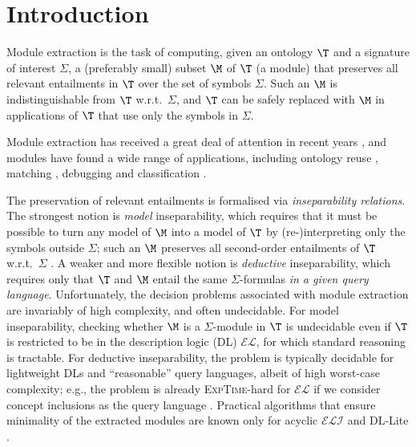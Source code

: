 
\section{Introduction}

Module extraction is the task of computing, given an ontology
$\T$ and a signature of interest $\Sigma$, a (preferably small) subset $\M$ of
$\T$ (a module) that preserves all relevant entailments
in $\T$ over the set of symbols $\Sigma$. 
Such an $\M$ is indistinguishable from $\T$ w.r.t.\ $\Sigma$, 
and $\T$ can be safely replaced with $\M$
in applications of $\T$ that use only the symbols in $\Sigma$. 

Module extraction has received a great deal of attention in recent years
\cite{DBLP:series/lncs/5445,GrauHKS08JAIR,DBLP:conf/www/SeidenbergR06,DBLP:journals/ai/KontchakovWZ10,DBLP:conf/dlog/GatensKW14,DBLP:conf/ijcai/VescovoPSS11,DBLP:conf/lpar/NortjeBM13}, 
and modules have found a wide range of applications, including
ontology reuse \cite{GrauHKS08JAIR,DBLP:conf/esws/Jimenez-RuizGSSL08},  matching \cite{DBLP:conf/semweb/Jimenez-RuizG11},
debugging \cite{DBLP:conf/aswc/SuntisrivarapornQJH08,LudwigORE} and
classification \cite{DBLP:conf/semweb/RomeroGH12,DBLP:conf/ore/TsarkovP12,DBLP:journals/jar/GrauHKS10}.
   
The preservation of relevant entailments is formalised via
\emph{inseparability relations}.
The strongest notion is \emph{model} inseparability, which requires
that it must be possible
to turn any
model of $\M$ into a model of $\T$
by (re-)interpreting only the symbols outside $\Sigma$; such an 
$\M$ preserves all second-order
entailments of $\T$ w.r.t.\ $\Sigma$ \cite{DBLP:journals/ai/KonevL0W13}.
A weaker and more flexible notion is \emph{deductive} inseparability,
which requires only that
$\T$ and $\M$ 
entail the same $\Sigma$-formulas \emph{in a given 
query language}.
Unfortunately, the decision problems
associated with module extraction are invariably of high complexity, 
and often undecidable.
For model inseparability, checking whether $\M$ is a $\Sigma$-module
in $\T$ 
is undecidable  even if $\T$ is restricted to be
in the description logic (DL) $\mathcal{EL}$,
for which standard reasoning is tractable.
For deductive inseparability, the problem is typically decidable for lightweight DLs and ``reasonable'' query languages, albeit of high worst-case complexity; e.g., the problem is already
\textsc{ExpTime}-hard for $\mathcal{EL}$ if we consider concept inclusions as
the query language \cite{DBLP:journals/jsc/LutzW10}.
Practical algorithms that ensure minimality of
the extracted modules are known only for 
acyclic $\mathcal{ELI}$ \cite{DBLP:journals/ai/KonevL0W13}
and DL-Lite \cite{DBLP:journals/ai/KontchakovWZ10}.

